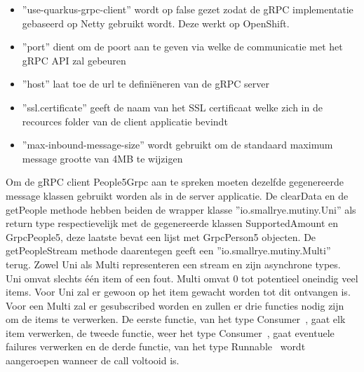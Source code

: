 \begin{itemize}
    \item ''use-quarkus-grpc-client'' wordt op false gezet zodat de gRPC implementatie gebaseerd op Netty gebruikt wordt. Deze werkt op OpenShift.
    \item ''port'' dient om de poort aan te geven via welke de communicatie met het gRPC API zal gebeuren
    \item ''host'' laat toe de url te defini\"eneren van de gRPC server
    \item ''ssl.certificate'' geeft de naam van het SSL certificaat welke zich in de recources folder van de client applicatie bevindt
    \item ''max-inbound-message-size'' wordt gebruikt om de standaard maximum message grootte van 4MB te wijzigen
\end{itemize}

Om de gRPC client People5Grpc aan te spreken moeten dezelfde gegenereerde message klassen gebruikt worden als in de server applicatie.
De clearData en de getPeople methode hebben beiden de wrapper klasse ''io.smallrye.mutiny.Uni'' als return type respectievelijk met de gegenereerde klassen
SupportedAmount en GrpcPeople5, deze laatste bevat een lijst met GrpcPerson5 objecten. De getPeopleStream methode daarentegen geeft een ''io.smallrye.mutiny.Multi'' terug.
Zowel Uni als Multi representeren een stream en zijn asynchrone types. Uni omvat slechts één item of een fout. Multi omvat 0 tot potentieel oneindig veel items.
Voor Uni zal er gewoon op het item gewacht worden tot dit ontvangen is. Voor een Multi zal er gesubscribed worden en zullen er drie functies nodig zijn om
de items te verwerken. De eerste functie, van het type Consumer~\parencite{Consumer}, gaat elk item verwerken, de tweede functie, weer het type Consumer~\parencite{Consumer},
gaat eventuele failures verwerken en de derde functie, van het type Runnable~\parencite{Runnable} wordt aangeroepen wanneer de call voltooid is.\newline
~\autocite{quarkusgRPCclient}\\
~\autocite{SmallRyeMutiny}\\
~\autocite{MultiSubscribing}\\

